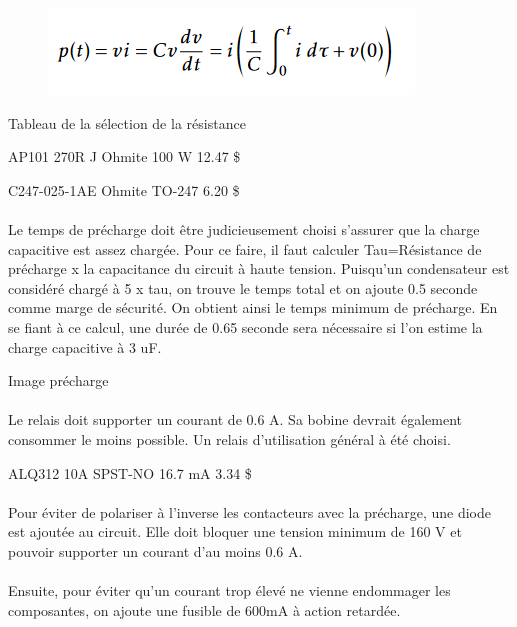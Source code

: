		\begin{figure}[H]
			\centering
			\includegraphics[width=0.4\linewidth]{../Images/CalculPuissancePrecharge}
		\end{figure}
		
		
		Tableau de la sélection de la résistance
		
		AP101 270R J 
		Ohmite
		100 W
		12.47 \$
		
		C247-025-1AE
		Ohmite
		TO-247
		6.20 \$

		\paragraph*{}		
		Le temps de précharge doit être judicieusement choisi s'assurer que la charge capacitive est assez chargée. Pour ce faire, il faut calculer Tau=Résistance de précharge x la capacitance du circuit à haute tension. Puisqu'un condensateur est considéré chargé à 5 x tau, on trouve le temps total et on ajoute 0.5 seconde comme marge de sécurité. On obtient ainsi le temps minimum de précharge. En se fiant à ce calcul, une durée de 0.65 seconde sera nécessaire si l'on estime la charge capacitive à 3 uF.

		Image précharge
		
		\paragraph*{}		
		Le relais doit supporter un courant de 0.6 A. Sa bobine devrait également consommer le moins possible. Un relais d'utilisation général à été choisi.
		
		
		ALQ312
		10A
		SPST-NO
		16.7 mA
		3.34 \$
		
	
		\paragraph*{}	
		Pour éviter de polariser à l'inverse les contacteurs avec la précharge, une diode est ajoutée au circuit. Elle doit bloquer une tension minimum de 160 V et pouvoir supporter un courant d'au moins 0.6 A. 
		
		\paragraph*{}			
		Ensuite, pour éviter qu'un courant trop élevé ne vienne endommager les composantes, on ajoute une fusible de 600mA à action retardée. 
		
		
		\begin{figure}[H]
			\centering
			\caption[Schéma circuit résistance de précharge]{}
			\label{fig:circuitprecharge}
		\end{figure}
			
		